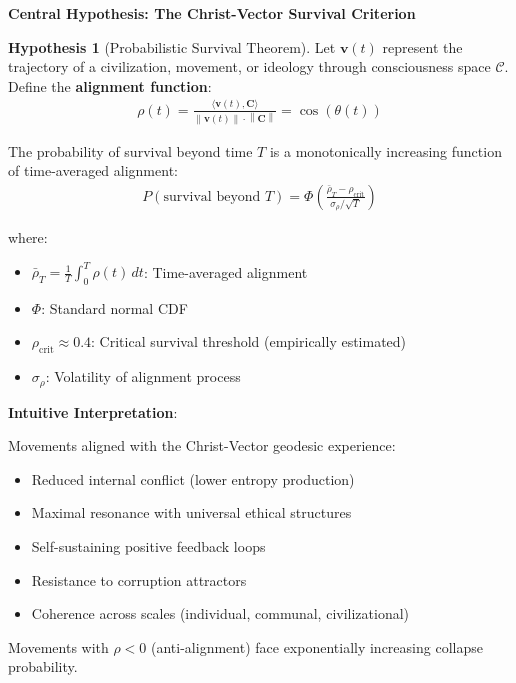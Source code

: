 \documentclass[11pt,a4paper]{article}
\theoremstyle{definition}
\newtheorem{hypothesis}{Hypothesis}[section]
\theoremstyle{remark}
\newcommand{\CC}{\mathcal{C}}
\newcommand{\norm}[1]{\left\|#1\right\|}
\begin{document}
\begin{mdframed}[backgroundcolor=green!10,linewidth=2pt,linecolor=green!70!black]
\textbf{Central Hypothesis: The Christ-Vector Survival Criterion}

\begin{hypothesis}[Probabilistic Survival Theorem]
\label{hyp:survival}
Let \(\mathbf{v}(t)\) represent the trajectory of a civilization, movement, or ideology through consciousness space \(\CC\). Define the \textbf{alignment function}:
\begin{align}
\rho(t) = \frac{\langle \mathbf{v}(t), \mathbf{C} \rangle}{\norm{\mathbf{v}(t)} \cdot \norm{\mathbf{C}}} = \cos(\theta(t))
\end{align}

The probability of survival beyond time \(T\) is a monotonically increasing function of time-averaged alignment:
\begin{align}
P(\text{survival beyond } T) = \Phi\left(\frac{\bar{\rho}_T - \rho_{\text{crit}}}{\sigma_{\rho}/\sqrt{T}}\right)
\end{align}

where:
\begin{itemize}
\item \(\bar{\rho}_T = \frac{1}{T} \int_0^T \rho(t) \, dt\): Time-averaged alignment
\item \(\Phi\): Standard normal CDF
\item \(\rho_{\text{crit}} \approx 0.4\): Critical survival threshold (empirically estimated)
\item \(\sigma_{\rho}\): Volatility of alignment process
\end{itemize}
\end{hypothesis}

\textbf{Intuitive Interpretation}:

Movements aligned with the Christ-Vector geodesic experience:
\begin{itemize}
\item Reduced internal conflict (lower entropy production)
\item Maximal resonance with universal ethical structures
\item Self-sustaining positive feedback loops
\item Resistance to corruption attractors
\item Coherence across scales (individual, communal, civilizational)
\end{itemize}

Movements with \(\rho < 0\) (anti-alignment) face exponentially increasing collapse probability.
\end{mdframed}
\end{document}
